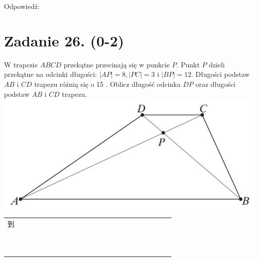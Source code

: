 \documentclass[10pt]{article}
\begin{document}
Odpowiedź:

\section*{Zadanie 26. (0-2)}
W trapezie \(A B C D\) przekątne przecinają się w punkcie \(P\). Punkt \(P\) dzieli przekątne na odcinki długości: \(|A P|=8,|P C|=3\) i \(|B P|=12\). Długości podstaw \(A B\) i \(C D\) trapezu różnią się o 15 . Oblicz długość odcinka \(D P\) oraz długości podstaw \(A B\) i \(C D\) trapezu.\\
\includegraphics[max width=\textwidth, center]{2024_11_21_724abc2cf5a71562f5b2g-10(1)}

\begin{center}
\begin{tabular}{|c|c|c|c|c|c|c|c|c|c|c|c|c|c|c|c|c|c|c|c|c|c|c|}
\hline
 &  &  &  &  &  &  &  &  &  &  &  &  &  &  &  &  &  &  &  &  &  &  \\
\hline
到 &  &  &  &  &  &  &  &  &  &  &  &  &  &  &  &  &  &  &  &  &  &  \\
\hline
 &  &  &  &  &  &  &  &  &  &  &  &  &  &  &  &  &  &  &  &  &  &  \\
\hline
 &  &  &  &  &  &  &  &  &  &  &  &  &  &  &  &  &  &  &  &  &  &  \\
\hline
 &  &  &  &  &  &  &  &  &  &  &  &  &  &  &  &  &  &  &  &  &  &  \\
\hline
 &  &  &  &  &  &  &  &  &  &  &  &  &  &  &  &  &  &  &  &  &  &  \\
\hline
 &  &  &  &  &  &  &  &  &  &  &  &  &  &  &  &  &  &  &  &  &  &  \\
\hline
 &  &  &  &  &  &  &  &  &  &  &  &  &  &  &  &  &  &  &  &  &  &  \\
\hline
 &  &  &  &  &  &  &  &  &  &  &  &  &  &  &  &  &  &  &  &  &  &  \\
\hline
 &  &  &  &  &  &  &  &  &  &  &  &  &  &  &  &  &  &  &  &  &  &  \\
\hline
 &  &  &  &  &  &  &  &  &  &  &  &  &  &  &  &  &  &  &  &  &  &  \\
\hline
 &  &  &  &  &  &  &  &  &  &  &  &  &  &  &  &  &  &  &  &  &  &  \\
\hline
\end{tabular}
\end{center}
\end{document}
